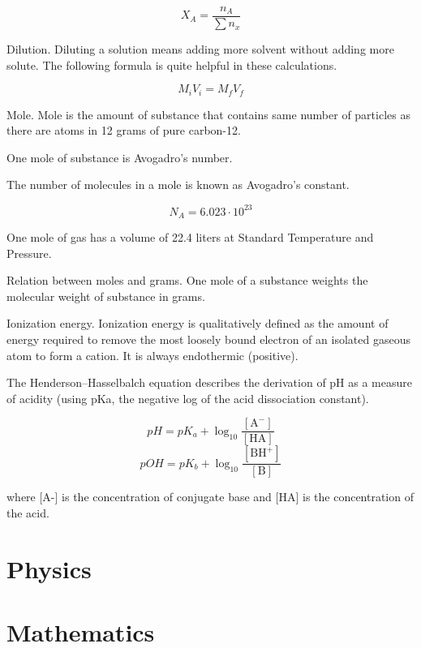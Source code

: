 \documentclass{book}
\begin{document}
\[X_A = \frac{n_A}{\sum{n_x}}\]

Dilution. Diluting a solution means adding more solvent without adding more solute.
The following formula is quite helpful in these calculations.

\[M_i V_i = M_f V_f\]

Mole. Mole is the amount of substance that contains same number of particles as there are atoms in 12 grams of pure carbon-12.

One mole of substance is Avogadro's number.

The number of molecules in a mole is known as Avogadro's constant.

\[N_A = 6.023 \cdot 10^{23}\]

One mole of gas has a volume of 22.4 liters at Standard Temperature and Pressure.

Relation between moles and grams.
One mole of a substance weights the molecular weight of substance in grams.

Ionization energy. Ionization energy is qualitatively defined as the amount of energy required to remove the most loosely bound electron of an isolated gaseous atom to form a cation. It is always endothermic (positive).

The Henderson–Hasselbalch equation describes the derivation of pH as a measure of acidity (using pKa, the negative log of the acid dissociation constant).

\[pH = pK_a + \log_{10} \frac{[\text{A}^-]}{[\text{HA}]}\]
\[pOH = pK_b + \log_{10} \frac{[\text{BH}^+]}{[\text{B}]}\]

where [A-] is the concentration of conjugate base and [HA] is the concentration of the acid.


\chapter{Physics}


\chapter{Mathematics}
\end{document}
